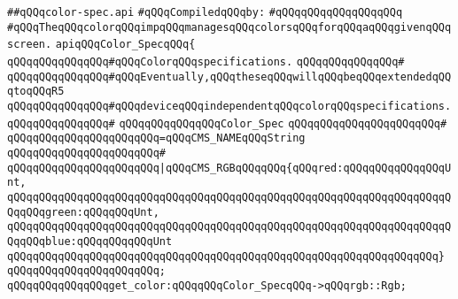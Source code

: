 \label{src/lib/x-kit/xclient/src/window/color-spec.api}
\verb|##qQQqcolor-spec.api|\newline
\newline
\verb|#qQQqCompiledqQQqby:|\newline
\verb|#qQQqqQQqqQQqqQQqqQQq|\newline
\newline
\newline
\newline
\verb|#qQQqTheqQQqcolorqQQqimpqQQqmanagesqQQqcolorsqQQqforqQQqaqQQqgivenqQQqscreen.|\newline
\newline
\newline
\verb|apiqQQqColor_SpecqQQq{|\newline
\newline
\verb|qQQqqQQqqQQqqQQq#qQQqColorqQQqspecifications.|\newline
\verb|qQQqqQQqqQQqqQQq#|\newline
\verb|qQQqqQQqqQQqqQQq#qQQqEventually,qQQqtheseqQQqwillqQQqbeqQQqextendedqQQqtoqQQqR5|\newline
\verb|qQQqqQQqqQQqqQQq#qQQqdeviceqQQqindependentqQQqcolorqQQqspecifications.|\newline
\verb|qQQqqQQqqQQqqQQq#|\newline
\verb|qQQqqQQqqQQqqQQqColor_Spec|\newline
\verb|qQQqqQQqqQQqqQQqqQQqqQQq#|\newline
\verb|qQQqqQQqqQQqqQQqqQQqqQQq=qQQqCMS_NAMEqQQqString|\newline
\verb|qQQqqQQqqQQqqQQqqQQqqQQq#|\newline
\verb|qQQqqQQqqQQqqQQqqQQqqQQq|\verb#|qQQqCMS_RGBqQQqqQQq{qQQqred:qQQqqQQqqQQqqQQqUnt,#\newline
\verb|qQQqqQQqqQQqqQQqqQQqqQQqqQQqqQQqqQQqqQQqqQQqqQQqqQQqqQQqqQQqqQQqqQQqqQQqqQQqgreen:qQQqqQQqUnt,|\newline
\verb|qQQqqQQqqQQqqQQqqQQqqQQqqQQqqQQqqQQqqQQqqQQqqQQqqQQqqQQqqQQqqQQqqQQqqQQqqQQqblue:qQQqqQQqqQQqUnt|\newline
\verb|qQQqqQQqqQQqqQQqqQQqqQQqqQQqqQQqqQQqqQQqqQQqqQQqqQQqqQQqqQQqqQQqqQQq}|\newline
\verb|qQQqqQQqqQQqqQQqqQQqqQQq;|\newline
\newline
\verb|qQQqqQQqqQQqqQQqget_color:qQQqqQQqColor_SpecqQQq->qQQqrgb::Rgb;|\newline
